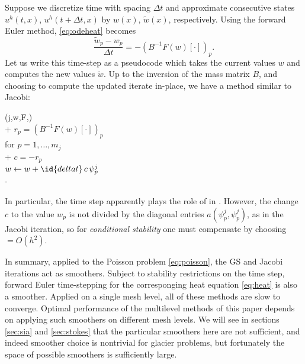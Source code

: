 \documentclass[letterpaper,final,12pt,reqno]{amsart}
\theoremstyle{claim}
\numberwithin{equation}{section}
\numberwithin{figure}{section}
\numberwithin{table}{section}
\numberwithin{theorem}{section}
\begin{document}
Suppose we discretize time with spacing $\Delta t$ and approximate consecutive states $u^h(t,x)$, $u^h(t+\Delta t,x)$ by $w(x)$, $\tilde w(x)$, respectively.  Using the forward Euler method, \eqref{eq:odeheat} becomes
\begin{equation}
\frac{\tilde w_p - w_p}{\Delta t} = - (B^{-1} F(w)[\cdot])_p. \label{eq:forwardeulerheat}
\end{equation}
Let us write this time-step as a pseudocode which takes the current values $w$ and computes the new values $\tilde w$.  Up to the inversion of the mass matrix $B$, and choosing to compute the updated iterate in-place, we have a method similar to Jacobi:
\begin{pseudo*} \label{ps:euler-timestep}
(j,w,F,)\text{:} \\+
    $r_p = (B^{-1} F(w)[\cdot])_p$ \qquad\qquad\qquad\qquad {} \\
    for $p=1,\dots,m_j$ \\+
        $\displaystyle c = - r_p$  \\
        $w \gets w + \id{deltat}\, c\, \psi_p^j$ \\-
\end{pseudo*}
In particular, the time step  apparently plays the role of  in .  However, the change $c$ to the value $w_p$ is not divided by the diagonal entries $a(\psi_p^j,\psi_p^j)$, as in the Jacobi iteration, so for \emph{conditional stability} \cite{Bueler2021} one must compensate by choosing  $=O(h^2)$.

In summary, applied to the Poisson problem \eqref{eq:poisson}, the GS and Jacobi iterations act as smoothers.  Subject to stability restrictions on the time step, forward Euler time-stepping for the corresponging heat equation \eqref{eq:heat} is also a smoother.  Applied on a single mesh level, all of these methods are slow to converge.  Optimal performance of the multilevel methods of this paper depends on applying such smoothers on different mesh levels.  We will see in sections \ref{sec:sia} and \ref{sec:stokes} that the particular smoothers here are not sufficient, and indeed smoother choice is nontrivial for glacier problems, but fortunately the space of possible smoothers is sufficiently large.
\end{document}
